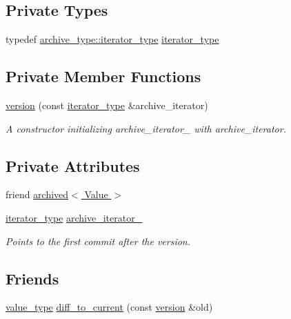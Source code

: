 \subsection*{Private Types}
\begin{DoxyCompactItemize}
\item 
typedef \hyperlink{classarchived_ae1e2e3488734f8f0bcd58f5f91f31d52}{archive\+\_\+type\+::iterator\+\_\+type} \hyperlink{classarchived_1_1version_acc56ba0e55a7f1856a459799d6d71aa9}{iterator\+\_\+type}
\end{DoxyCompactItemize}
\subsection*{Private Member Functions}
\begin{DoxyCompactItemize}
\item 
\hyperlink{classarchived_1_1version_a6fa630c864ba44fceceaee87c04d6767}{version} (const \hyperlink{classarchived_1_1version_acc56ba0e55a7f1856a459799d6d71aa9}{iterator\+\_\+type} \&archive\+\_\+iterator)
\begin{DoxyCompactList}\small\item\em A constructor initializing archive\+\_\+iterator\+\_\+ with archive\+\_\+iterator. \end{DoxyCompactList}\end{DoxyCompactItemize}
\subsection*{Private Attributes}
\begin{DoxyCompactItemize}
\item 
friend \hyperlink{classarchived_1_1version_a0dcd43fda1e30a8d63bdfc22624fd185}{archived$<$ Value $>$}
\item 
\hyperlink{classarchived_1_1version_acc56ba0e55a7f1856a459799d6d71aa9}{iterator\+\_\+type} \hyperlink{classarchived_1_1version_a151e7efe6febec7b504c59af4e0fb153}{archive\+\_\+iterator\+\_\+}
\begin{DoxyCompactList}\small\item\em Points to the first commit after the version. \end{DoxyCompactList}\end{DoxyCompactItemize}
\subsection*{Friends}
\begin{DoxyCompactItemize}
\item 
\hyperlink{classarchived_1_1version_ae9028b053631ebb7832c9457cac4c29b}{value\+\_\+type} \hyperlink{classarchived_1_1version_ab88b258861d0c138b2f978d4aab59be5}{diff\+\_\+to\+\_\+current} (const \hyperlink{classarchived_1_1version}{version} \&old)
\end{DoxyCompactItemize}


